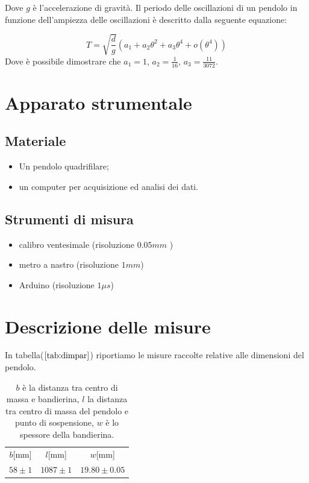 \documentclass{article}
\begin{document}
Dove  $g $ è l'accelerazione di gravità.
Il periodo delle oscillazioni di un pendolo in funzione dell'ampiezza delle oscillazioni è descritto dalla seguente equazione:

\begin{equation}
T = \sqrt{\frac{d}{g}} (a_1+a_2\theta^2+a_3\theta^4+ o( \theta^4 ))
\label{eq:tht}
\end{equation}
Dove è possibile dimostrare che $a_1=1$, $a_2=\frac{1}{16}$, $a_3=\frac{11}{3072}$.






\section{Apparato strumentale}

\subsection{Materiale}

\begin{itemize}
\item  Un pendolo quadrifilare;
\item  un computer per acquisizione ed analisi dei dati.
\end{itemize}

\subsection{Strumenti di misura}

\begin{itemize}
\item  calibro  ventesimale (risoluzione $ 0.05 mm$ )
\item  metro a nastro (risoluzione $1 mm$)
\item Arduino (risoluzione $1\mu s$)
\end{itemize}





\section{Descrizione delle misure}


In tabella($\ref{tab:dimpar}$) riportiamo le misure raccolte relative alle dimensioni del pendolo.
\begin{table}[h!]
		\centering
		\begin{tabular}{|ccc|}
			\hline
			$b $[mm] & $l$[mm] & $w$[mm]	\\
			$58 \pm 1$	 & 	$	1087\pm1$ 	& $19.80\pm0.05$\\
			\hline
			
		\end{tabular}
		
		\label{tab:dimpar}	
		\caption{$b$ è la distanza tra centro di massa e bandierina, $l$ la distanza tra centro di massa del pendolo e  punto di sospensione, $w$ è lo spessore della bandierina.} 


\end{table}
\end{document}
